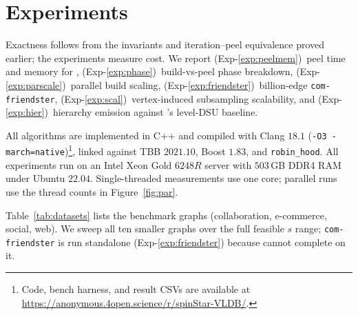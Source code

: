 \section{Experiments}\label{sec:exp}

Exactness follows from the invariants and iteration--peel equivalence proved earlier; the experiments measure cost.
%
We report (Exp-\ref{exp:peelmem})~peel time and memory for \spinStar{}, (Exp-\ref{exp:phase})~build-vs-peel phase breakdown, (Exp-\ref{exp:parscale})~parallel build scaling, (Exp-\ref{exp:friendster})~billion-edge \texttt{com-friendster}, (Exp-\ref{exp:scal})~vertex-induced subsampling scalability, and (Exp-\ref{exp:hier})~hierarchy emission against \cbnd{}'s level-DSU baseline.

All algorithms are implemented in C++ and compiled with Clang $18.1$ (\texttt{-O3 -march=native})\footnote{Code, bench harness, and result CSVs are available at \url{https://anonymous.4open.science/r/spinStar-VLDB/}.}, linked against TBB $2021.10$, Boost $1.83$, and \texttt{robin\_hood}.
%
All experiments run on an Intel Xeon Gold $6248R$ server with $503$\,GB DDR4 RAM under Ubuntu $22.04$.
%
Single-threaded measurements use one core; parallel runs use the thread counts in Figure~\ref{fig:par}.

Table~\ref{tab:datasets} lists the benchmark graphs (collaboration, e-commerce, social, web).
%
We sweep all ten smaller graphs over the full feasible $s$ range; \texttt{com-friendster} is run standalone (Exp-\ref{exp:friendster}) because \cbnd{} cannot complete on it.

